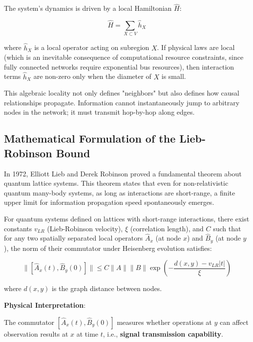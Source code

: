 The system's dynamics is driven by a local Hamiltonian $\hat{H}$:

\begin{equation}
\hat{H} = \sum_{X \subset V} \hat{h}_X
\end{equation}

where $\hat{h}_X$ is a local operator acting on subregion $X$. If physical laws are local (which is an inevitable consequence of computational resource constraints, since fully connected networks require exponential bus resources), then interaction terms $\hat{h}_X$ are non-zero only when the diameter of $X$ is small.

This algebraic locality not only defines "neighbors" but also defines how causal relationships propagate. Information cannot instantaneously jump to arbitrary nodes in the network; it must transmit hop-by-hop along edges.

\subsection{Mathematical Formulation of the Lieb-Robinson Bound}

In 1972, Elliott Lieb and Derek Robinson proved a fundamental theorem about quantum lattice systems. This theorem states that even for non-relativistic quantum many-body systems, as long as interactions are short-range, a finite upper limit for information propagation speed spontaneously emerges.

\begin{theorem}
For quantum systems defined on lattices with short-range interactions, there exist constants $v_{LR}$ (Lieb-Robinson velocity), $\xi$ (correlation length), and $C$ such that for any two spatially separated local operators $\hat{A}_x$ (at node $x$) and $\hat{B}_y$ (at node $y$), the norm of their commutator under Heisenberg evolution satisfies:

\begin{equation}
\| [\hat{A}_x(t), \hat{B}_y(0)] \| \le C \|A\| \|B\| \exp\left( -\frac{d(x,y) - v_{LR}|t|}{\xi} \right)
\end{equation}

where $d(x,y)$ is the graph distance between nodes.
\end{theorem}

\textbf{Physical Interpretation}:

The commutator $[\hat{A}_x(t), \hat{B}_y(0)]$ measures whether operations at $y$ can affect observation results at $x$ at time $t$, i.e., \textbf{signal transmission capability}.


